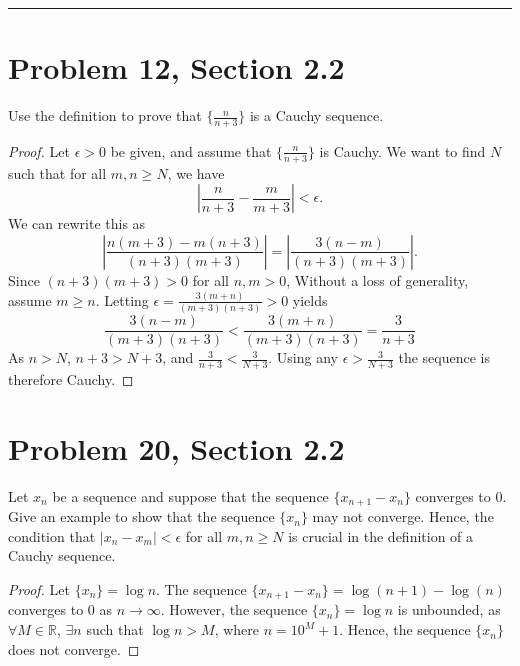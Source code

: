 \documentclass[12pt]{article}
\author{Kiran Jones \\
  \texttt{kiran.p.jones.27@dartmouth.edu}}
\date{Due: July 25, 2025}
\begin{document}
  \maketitle
  \thispagestyle{empty}
  \noindent
  \rule{\linewidth}{0.4pt}
  \newpage
  
  
  \section*{Problem 12, Section 2.2}
  Use the definition to prove that $\{\frac{n}{n+3}\}$ is a Cauchy sequence.
  \begin{proof}
    Let $\epsilon > 0$ be given, and assume that $\{\frac{n}{n+3}\}$ is Cauchy. We want to find $N$ such that for all $m, n \geq N$, we have
    \[
      \left| \frac{n}{n+3} - \frac{m}{m+3} \right| < \epsilon.
    \]
    We can rewrite this as
    \[
      \left| \frac{n(m+3) - m(n+3)}{(n+3)(m+3)} \right| = \left| \frac{3(n-m)}{(n+3)(m+3)} \right|.
    \]
    Since $(n+3)(m+3) > 0$ for all $n, m > 0$, Without a loss of generality, assume $m \geq n$. Letting $\epsilon = \frac{3(m+n)}{(m+3)(n+3)} > 0$ yields
    \[
      \frac{3(n-m)}{(m+3)(n+3)} < \frac{3(m+n)}{(m+3)(n+3)} = \frac{3}{n+3}
    \]
    As $n > N$, $n+3 > N+3$, and $\frac{3}{n+3} < \frac{3}{N+3}$. Using any $\epsilon > \frac{3}{N+3}$ the sequence is therefore Cauchy.
  \end{proof}

  \newpage



  \section*{Problem 20, Section 2.2}
  Let $x_n$ be a sequence and suppose that the sequence $\{x_{n+1}-x_n\}$ converges to $0$. Give an example to show that the sequence $\{x_n\}$ may not converge. Hence, the condition that $|x_n-x_m|<\epsilon$ for all $m, n \geq N$ is crucial in the definition of a Cauchy sequence.
  \begin{proof}
    Let $\{x_n\} = \log n$. The sequence $\{x_{n+1}-x_n\} = \log(n+1) - \log(n)$ converges to $0$ as $n \to \infty$. However, the sequence $\{x_n\} = \log n$ is unbounded, as $\forall M \in \mathbb{R}$, $\exists n$ such that $\log n > M$, where $n = 10^M+1$. Hence, the sequence $\{x_n\}$ does not converge.

  \end{proof}
  
  \newpage
\end{document}
